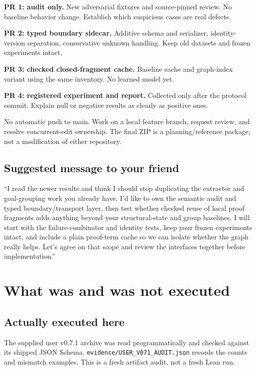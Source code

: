 \documentclass[
  10pt,
]{article}
\begin{document}
\textbf{PR 1: audit only.} New adversarial fixtures and source-pinned
review. No baseline behavior change. Establish which suspicious cases
are real defects.

\textbf{PR 2: typed boundary sidecar.} Additive schema and serializer,
identity-version separation, conservative unknown handling. Keep old
datasets and frozen experiments intact.

\textbf{PR 3: checked closed-fragment cache.} Baseline cache and
graph-index variant using the same inventory. No learned model yet.

\textbf{PR 4: registered experiment and report.} Collected only after
the protocol commit. Explain null or negative results as clearly as
positive ones.

No automatic push to main. Work on a local feature branch, request
review, and resolve concurrent-edit ownership. The final ZIP is a
planning/reference package, not a modification of either repository.

\subsection{Suggested message to your
friend}\label{suggested-message-to-your-friend}

``I read the newer results and think I should stop duplicating the
extractor and goal-grouping work you already have. I'd like to own the
semantic audit and typed boundary/transport layer, then test whether
checked reuse of local proof fragments adds anything beyond your
structural-state and group baselines. I will start with the
failure-combinator and identity tests, keep your frozen experiments
intact, and include a plain proof-term cache so we can isolate whether
the graph really helps. Let's agree on that scope and review the
interfaces together before implementation.''

\section{What was and was not
executed}\label{what-was-and-was-not-executed}

\subsection{Actually executed here}\label{actually-executed-here}

The supplied user v0.7.1 archive was read programmatically and checked
against its shipped JSON Schema.
\texttt{evidence/USER\_V071\_AUDIT.json} records the counts and mismatch
examples. This is a fresh artifact audit, not a fresh Lean run.
\end{document}
